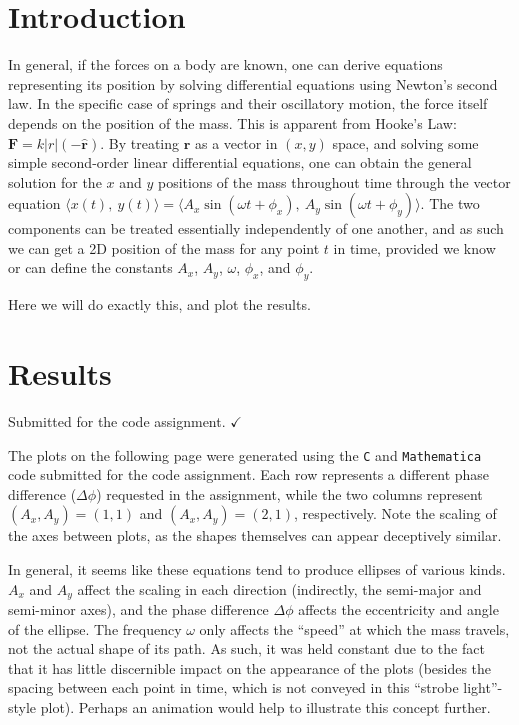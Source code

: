 \documentclass{article}
\author{\hwauthor}
\title{\hwtitle}
\date{\hwdate}
\begin{document}
\maketitle
\thispagestyle{fancy}

\section{Introduction}

In general, if the forces on a body are known, one can derive equations representing its position by solving differential equations using Newton's second law. In the specific case of springs and their oscillatory motion, the force itself depends on the position of the mass. This is apparent from Hooke's Law: $\mathbf{F} = k|r|(-\hat{\mathbf{r}})$. By treating $\mathbf{r}$ as a vector in $(x,y)$ space, and solving some simple second-order linear differential equations, one can obtain the general solution for the $x$ and $y$ positions of the mass throughout time through the vector equation $\displaystyle \langle x(t),\ y(t)\rangle  = \langle A_x\sin(\omega t +\phi_x),\ A_y\sin(\omega t + \phi_y)\rangle$. The two components can be treated essentially independently of one another, and as such we can get a 2D position of the mass for any point $t$ in time, provided we know or can define the constants $A_x$, $A_y$, $\omega$, $\phi_x$, and $\phi_y$.

Here we will do exactly this, and plot the results.

\section{Results}

\bigskip
{}
\medskip

Submitted for the code assignment. $\checkmark$

\bigskip
{}
\medskip

The plots on the following page were generated using the \texttt{C} and \texttt{Mathematica} code submitted for the code assignment. Each row represents a different phase difference ($\Delta\phi$) requested in the assignment, while the two columns represent $(A_x,A_y)=(1,1)$ and $(A_x,A_y)=(2,1)$, respectively. Note the scaling of the axes between plots, as the shapes themselves can appear deceptively similar.

\bigskip
{}
\medskip

In general, it seems like these equations tend to produce ellipses of various kinds. $A_x$ and $A_y$ affect the scaling in each direction (indirectly, the semi-major and semi-minor axes), and the phase difference $\Delta\phi$ affects the eccentricity and angle of the ellipse. The frequency $\omega$ only affects the ``speed'' at which the mass travels, not the actual shape of its path. As such, it was held constant due to the fact that it has little discernible impact on the appearance of the plots (besides the spacing between each point in time, which is not conveyed in this ``strobe light''-style plot). Perhaps an animation would help to illustrate this concept further.
\end{document}
